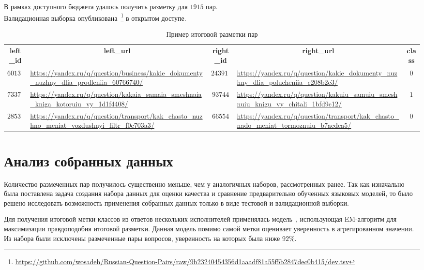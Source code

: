 \documentclass[a4paper,14pt]{extarticle}
\begin{document}
В рамках доступного бюджета удалось получить разметку для $1915$ пар.\\
Валидационная выборка опубликована~\footnote{\url{https://github.com/wosadeh/Russian-Question-Pairs/raw/9b23240454356d1aaadf81a55f5b2847dec0b415/dev.tsv}} в открытом доступе.
\begin{table}[htbp]
    \caption{Пример итоговой разметки пар}
    \label{table:data_sample}
    \footnotesize
    \centering
    \begin{tabular}{ | c | p{5cm} | c | p{5cm} | c |}
        \hline
        \textbf{left\_id} &\multicolumn{1}{c|}{\textbf{left\_url}}
        &\textbf{right\_id} & \multicolumn{1}{c|}{\textbf{right\_url}}
        &\textbf{class}\\
        \hline
        $60130$
        &\url{https://yandex.ru/q/question/business/kakie_dokumenty_nuzhny_dlia_prodleniia_60766740/}
        &$243915$
        &\url{https://yandex.ru/q/question/kakie_dokumenty_nuzhny_dlia_polucheniia_c208b2c3/}
        &$0$
        \\
        $73372$
        &\url{https://yandex.ru/q/question/kakaia_samaia_smeshnaia_kniga_kotoruiu_vy_1d1f4408/}
        &$93744$
        &\url{https://yandex.ru/q/question/kakuiu_samuiu_smeshnuiu_knigu_vy_chitali_1bfd9c12/}
        &$1$
        \\
        $28539$
        &\url{https://yandex.ru/q/question/transport/kak_chasto_nuzhno_meniat_vozdushnyi_filtr_f0c703a3/}
        &$66554$
        &\url{https://yandex.ru/q/question/transport/kak_chasto_nado_meniat_tormoznuiu_b7acdca5/}
        &$0$
        \\
        \hline
    \end{tabular}
\end{table}

\section{Анализ собранных данных}
Количество размеченных пар получилось существенно меньше, чем у аналогичных наборов, рассмотренных ранее.
Так как изначально была поставлена задача создания набора данных для оценки качества и сравнение предварительно обученных языковых моделей, то было решено исследовать возможность применения собранных данных только в виде тестовой и валидационной выборки.

Для получения итоговой метки классов из ответов нескольких исполнителей применялась модель~\autocite{dawid1979maximum}, использующая \mbox{EM}-алгоритм для максимизации правдоподобия итоговой разметки.
Данная модель помимо самой метки оценивает уверенность в агрегированном значении.
Из набора были исключены размеченные пары вопросов, уверенность на которых была ниже $92\%$.
\end{document}
